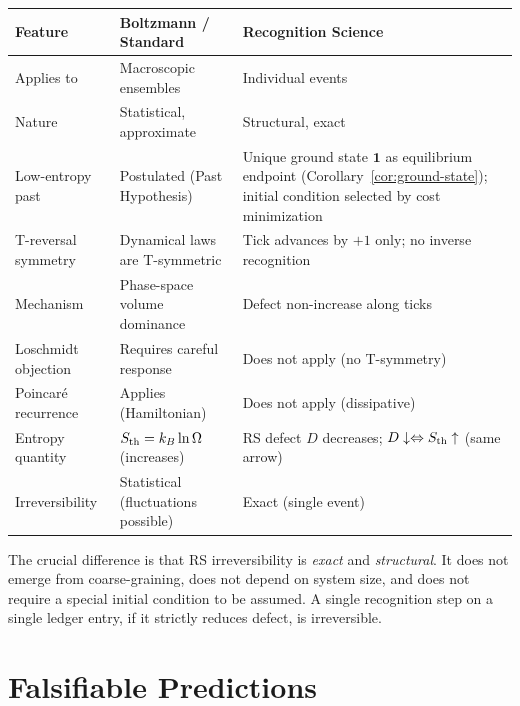 \documentclass[12pt,a4paper]{article}
\theoremstyle{definition}
\theoremstyle{remark}
\begin{document}
\begin{center}
\renewcommand{\arraystretch}{1.3}
\begin{tabular}{@{}p{3.5cm}p{5.0cm}p{5.5cm}@{}}
\toprule
\textbf{Feature} & \textbf{Boltzmann / Standard} & \textbf{Recognition Science} \\
\midrule
Applies to & Macroscopic ensembles & Individual events \\
Nature & Statistical, approximate & Structural, exact \\
Low-entropy past & Postulated (Past Hypothesis) & Unique ground state $\mathbf{1}$ as equilibrium endpoint (Corollary~\ref{cor:ground-state}); initial condition selected by cost minimization \\
T-reversal symmetry & Dynamical laws are T-symmetric & Tick advances by $+1$ only; no inverse recognition \\
Mechanism & Phase-space volume dominance & Defect non-increase along ticks \\
Loschmidt objection & Requires careful response & Does not apply (no T-symmetry) \\
Poincar\'e recurrence & Applies (Hamiltonian) & Does not apply (dissipative) \\
Entropy quantity & $S_{\rm th} = k_B \ln\Omega$ (increases) & RS defect $D$ decreases; $D \downarrow \Leftrightarrow S_{\rm th} \uparrow$ (same arrow) \\
Irreversibility & Statistical (fluctuations possible) & Exact (single event) \\
\bottomrule
\end{tabular}
\end{center}

The crucial difference is that RS irreversibility is \emph{exact} and
\emph{structural}.  It does not emerge from coarse-graining, does not
depend on system size, and does not require a special initial condition
to be assumed.  A single recognition step on a single ledger entry, if
it strictly reduces defect, is irreversible.

\section{Falsifiable Predictions}
\label{sec:falsify}
\end{document}
